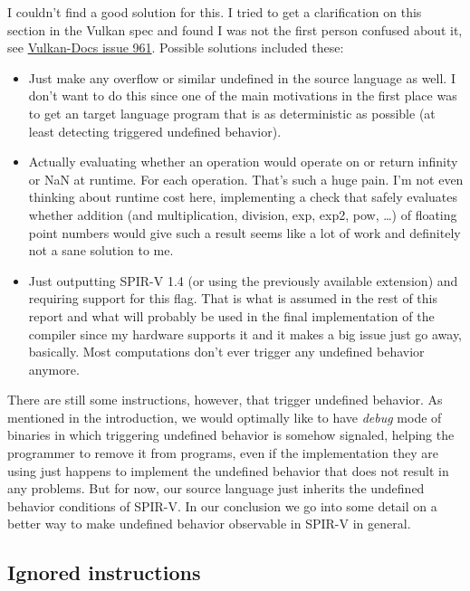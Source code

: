 \documentclass[letterpaper,12pt]{article}
\begin{document}
I couldn't find a good solution for this. I tried to get
a clarification on this section in the Vulkan spec and found I was not
the first person confused about it, see \href{https://github.com/KhronosGroup/Vulkan-Docs/issues/961}{Vulkan-Docs issue 961}.
Possible solutions included these:

\begin{itemize}
	\item Just make any overflow or similar undefined in the source language
		as well. I don't want to do this since one of the main motivations
		in the first place was to get an target language program
		that is as deterministic as possible (at least detecting triggered
		undefined behavior).
	\item Actually evaluating whether an operation would operate on or
		return infinity or NaN at runtime. For each operation. That's
		such a huge pain. I'm not even thinking about runtime cost here,
		implementing a check that safely evaluates whether addition
		(and multiplication, division, exp, exp2, pow, \ldots) of floating
		point numbers would give such a result seems like a lot of work
		and definitely not a sane solution to me.
	\item Just outputting SPIR-V 1.4 (or using the previously available
		extension) and requiring support for this flag. That is what
		is assumed in the rest of this report and what will probably
		be used in the final implementation of the compiler since my hardware
		supports it and it makes a big issue just go away, basically. 
		Most computations don't ever trigger any undefined behavior
		anymore.
\end{itemize}

There are still some instructions, however, that trigger undefined
behavior. As mentioned in the introduction, we would optimally like
to have \textit{debug} mode of binaries in which triggering
undefined behavior is somehow signaled, helping the programmer
to remove it from programs, even if the implementation they are using
just happens to implement the undefined behavior that does not
result in any problems. But for now, our source language just inherits
the undefined behavior conditions of SPIR-V. In our conclusion we
go into some detail on a better way to make undefined behavior
observable in SPIR-V in general.

\subsection{Ignored instructions}
\end{document}
